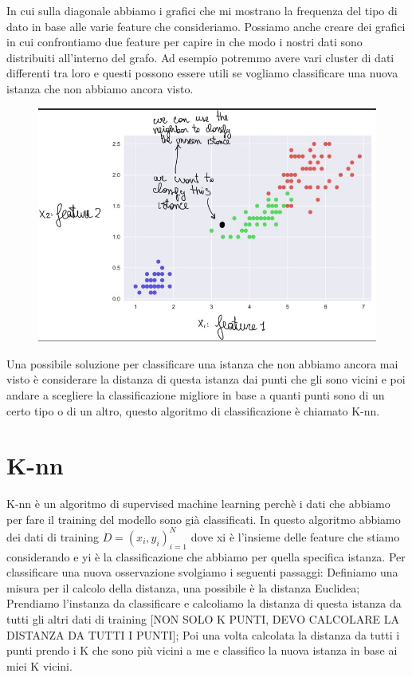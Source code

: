 \documentclass[14pt]{extreport}
\begin{document}
In cui sulla diagonale abbiamo i grafici che mi mostrano la frequenza del tipo di dato in base alle varie feature che consideriamo. Possiamo anche
creare dei grafici in cui confrontiamo due feature per capire in che modo i nostri dati sono distribuiti all’interno del grafo. Ad esempio potremmo
avere vari cluster di dati differenti tra loro e questi possono essere utili se vogliamo classificare una nuova istanza che non abbiamo ancora visto.


\begin{figure}[H]
\centering
\includegraphics[width=0.7\linewidth]{56.jpeg}
\end{figure}

Una possibile soluzione per classificare una istanza che non abbiamo ancora mai visto è considerare la distanza di questa istanza dai punti che gli
sono vicini e poi andare a scegliere la classificazione migliore in base a quanti punti sono di un certo tipo o di un altro, questo algoritmo di
classificazione è chiamato K-nn.

\section{K-nn}

K-nn è un algoritmo di supervised machine learning perchè i dati che abbiamo per fare il training del modello sono già classificati. In questo
algoritmo abbiamo dei dati di training $D = {(x_i, y_i)}^N_{i=1}$ dove xi è l’insieme delle feature che stiamo considerando e yi è la classificazione
che abbiamo per quella specifica istanza. Per classificare una nuova osservazione svolgiamo i seguenti passaggi: Definiamo una misura per il calcolo
della distanza, una possibile è la distanza Euclidea; Prendiamo l’instanza da classificare e calcoliamo la distanza di questa istanza da tutti gli
altri dati di training [NON SOLO K PUNTI, DEVO CALCOLARE LA DISTANZA DA TUTTI I PUNTI]; Poi una volta calcolata la distanza da tutti i punti prendo i
K che sono più vicini a me e classifico la nuova istanza in base ai miei K vicini.
\end{document}
